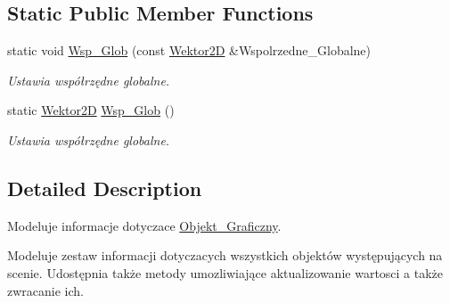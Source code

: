 \subsection*{Static Public Member Functions}
\begin{DoxyCompactItemize}
\item 
\hypertarget{class_objekt___graficzny_a3c2618724fff0c58433d50f811a166f5}{static void \hyperlink{class_objekt___graficzny_a3c2618724fff0c58433d50f811a166f5}{Wsp\+\_\+\+Glob} (const \hyperlink{class_wektor2_d}{Wektor2\+D} \&Wspolrzedne\+\_\+\+Globalne)}\label{class_objekt___graficzny_a3c2618724fff0c58433d50f811a166f5}

\begin{DoxyCompactList}\small\item\em Ustawia współrzędne globalne. \end{DoxyCompactList}\item 
\hypertarget{class_objekt___graficzny_ae2372551a897cab2b7ce0fadbb31ed5e}{static \hyperlink{class_wektor2_d}{Wektor2\+D} \hyperlink{class_objekt___graficzny_ae2372551a897cab2b7ce0fadbb31ed5e}{Wsp\+\_\+\+Glob} ()}\label{class_objekt___graficzny_ae2372551a897cab2b7ce0fadbb31ed5e}

\begin{DoxyCompactList}\small\item\em Ustawia współrzędne globalne. \end{DoxyCompactList}\end{DoxyCompactItemize}


\subsection{Detailed Description}
Modeluje informacje dotyczace \hyperlink{class_objekt___graficzny}{Objekt\+\_\+\+Graficzny}. 

Modeluje zestaw informacji dotyczacych wszystkich objektów występujących na scenie. Udostępnia także metody umozliwiające aktualizowanie wartosci a także zwracanie ich. 

